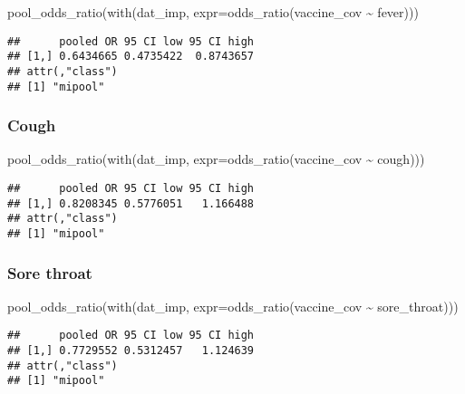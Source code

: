 \documentclass[
]{article}
\newenvironment{Shaded}{\begin{snugshade}}{\end{snugshade}}
\newcommand{\AttributeTok}[1]{\textcolor[rgb]{0.77,0.63,0.00}{#1}}
\newcommand{\FunctionTok}[1]{\textcolor[rgb]{0.00,0.00,0.00}{#1}}
\newcommand{\NormalTok}[1]{#1}
\newcommand{\SpecialCharTok}[1]{\textcolor[rgb]{0.00,0.00,0.00}{#1}}
\begin{document}
\begin{Shaded}
\begin{Highlighting}[]
\FunctionTok{pool\_odds\_ratio}\NormalTok{(}\FunctionTok{with}\NormalTok{(dat\_imp, }\AttributeTok{expr=}\FunctionTok{odds\_ratio}\NormalTok{(vaccine\_cov }\SpecialCharTok{\textasciitilde{}}\NormalTok{ fever))) }
\end{Highlighting}
\end{Shaded}

\begin{verbatim}
##      pooled OR 95 CI low 95 CI high
## [1,] 0.6434665 0.4735422  0.8743657
## attr(,"class")
## [1] "mipool"
\end{verbatim}

\hypertarget{cough-1}{%
\subsubsection{Cough}\label{cough-1}}

\begin{Shaded}
\begin{Highlighting}[]
\FunctionTok{pool\_odds\_ratio}\NormalTok{(}\FunctionTok{with}\NormalTok{(dat\_imp, }\AttributeTok{expr=}\FunctionTok{odds\_ratio}\NormalTok{(vaccine\_cov }\SpecialCharTok{\textasciitilde{}}\NormalTok{ cough))) }
\end{Highlighting}
\end{Shaded}

\begin{verbatim}
##      pooled OR 95 CI low 95 CI high
## [1,] 0.8208345 0.5776051   1.166488
## attr(,"class")
## [1] "mipool"
\end{verbatim}

\hypertarget{sore-throat-1}{%
\subsubsection{Sore throat}\label{sore-throat-1}}

\begin{Shaded}
\begin{Highlighting}[]
\FunctionTok{pool\_odds\_ratio}\NormalTok{(}\FunctionTok{with}\NormalTok{(dat\_imp, }\AttributeTok{expr=}\FunctionTok{odds\_ratio}\NormalTok{(vaccine\_cov }\SpecialCharTok{\textasciitilde{}}\NormalTok{ sore\_throat))) }
\end{Highlighting}
\end{Shaded}

\begin{verbatim}
##      pooled OR 95 CI low 95 CI high
## [1,] 0.7729552 0.5312457   1.124639
## attr(,"class")
## [1] "mipool"
\end{verbatim}
\end{document}
